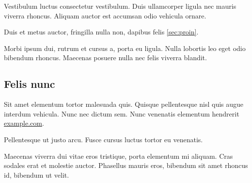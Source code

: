 Vestibulum luctus consectetur vestibulum. Duis ullamcorper ligula nec mauris
viverra rhoncus. Aliquam auctor est accumsan odio vehicula ornare.

\begin{remark}
Duis et metus auctor, fringilla nulla non, dapibus felis \ref{sec:proin}.
\end{remark}

Morbi ipsum dui, rutrum et cursus a, porta eu ligula. Nulla lobortis leo eget
odio bibendum rhoncus. Maecenas posuere nulla nec felis viverra blandit.

\subsection{Felis nunc}

Sit amet elementum tortor malesuada quis. Quisque pellentesque nisl quis augue
interdum vehicula. Nunc nec dictum sem. Nunc venenatis elementum hendrerit \href{https://example.com/}{example.com}.

\begin{remark}
Pellentesque ut justo arcu. Fusce cursus luctus tortor eu venenatis.
\end{remark}

Maecenas viverra dui vitae eros tristique, porta elementum mi aliquam. Cras
sodales erat et molestie auctor. Phasellus mauris eros, bibendum sit amet
rhoncus id, bibendum ut velit.
